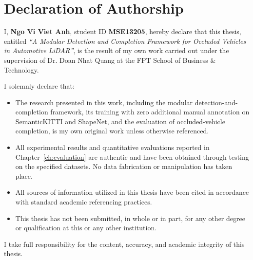 \documentclass[a4paper,12pt]{report}
\begin{document}
\section*{Declaration of Authorship}
I, \textbf{Ngo Vi Viet Anh}, student ID \textbf{MSE13205}, hereby declare that this thesis, entitled \textit{``A Modular Detection and Completion Framework for Occluded Vehicles in Automotive LiDAR''}, is the result of my own work carried out under the supervision of Dr. Doan Nhat Quang at the FPT School of Business \& Technology.

I solemnly declare that:
\begin{itemize}
    \item The research presented in this work, including the modular detection-and-completion framework, its training with zero additional manual annotation on SemanticKITTI and ShapeNet, and the evaluation of occluded-vehicle completion, is my own original work unless otherwise referenced.
    \item All experimental results and quantitative evaluations reported in Chapter~\ref{ch:evaluation} are authentic and have been obtained through testing on the specified datasets. No data fabrication or manipulation has taken place.
    \item All sources of information utilized in this thesis have been cited in accordance with standard academic referencing practices.
    \item This thesis has not been submitted, in whole or in part, for any other degree or qualification at this or any other institution.
\end{itemize}

I take full responsibility for the content, accuracy, and academic integrity of this thesis.
\clearpage

\tableofcontents
\listoffigures
\listoftables
\clearpage


%
%
%
\end{document}

